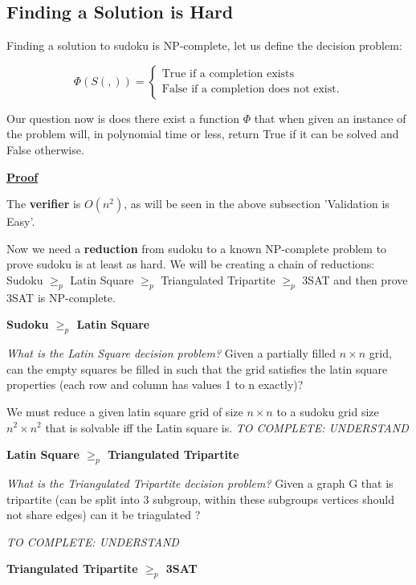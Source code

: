 \documentclass[a4paper,12pt]{article}
\begin{document}
	\subsection{Finding a Solution is Hard}
		
Finding a solution to sudoku is NP-complete, let us define the decision problem:

		\begin{equation}
		        \Phi (S(,)) = \begin{cases}
		            \text{True if a completion exists} \\
		            \text{False if a completion does not exist}.
				\end{cases}
		\end{equation}

Our question now is does there exist a function $\Phi$ that when given an instance of the problem will, in polynomial time or less, return True if it can be solved and False otherwise.

\textbf{\underline{Proof}}

The \textbf{verifier} is $O(n^2)$, as will be seen in the above subsection 'Validation is Easy'.

Now we need a \textbf{reduction} from sudoku to a known NP-complete problem to prove sudoku is at least as hard. We will be creating a chain of reductions: Sudoku $\geq_p$  Latin Square $\geq_p$  Triangulated Tripartite $\geq_p$  3SAT and then prove 3SAT is NP-complete.

\textbf{Sudoku $\geq_p$ Latin Square}

\textit{What is the Latin Square decision problem?} Given a partially filled $n \times n$ grid, can the empty squares be filled in such that the grid satisfies the latin square properties (each row and column has values 1 to n exactly)?

We must reduce a given latin square grid of size $n \times n$ to a sudoku grid size $n^2 \times n^2$ that is solvable iff the Latin square is. \textit{TO COMPLETE: UNDERSTAND \cite{Complexity}}

\textbf{Latin Square $\geq_p$ Triangulated Tripartite}

\textit{What is the Triangulated Tripartite decision problem?} Given a graph G that is tripartite (can be split into 3 subgroup, within these subgroups vertices should not share edges) can it be triagulated ?


 \textit{TO COMPLETE: UNDERSTAND \cite{latin to tripartite}}

\textbf{Triangulated Tripartite $\geq_p$ 3SAT}
\end{document}
